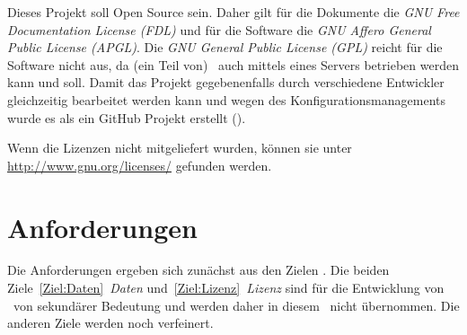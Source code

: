 Dieses Projekt soll Open Source sein.
Daher gilt für die Dokumente die \emph{GNU Free Documentation License (FDL)} und für die Software die \emph{GNU Affero General Public License (APGL)}.
Die \emph{GNU General Public License (GPL)} reicht für die Software nicht aus, da (ein Teil von) \ASBA\ auch mittels eines Servers betrieben werden kann und soll.
Damit das Projekt gegebenenfalls durch verschiedene Entwickler gleichzeitig bearbeitet werden kann und wegen des Konfigurationsmanagements wurde es als ein GitHub Projekt erstellt ().

Wenn die Lizenzen nicht mitgeliefert wurden, können sie unter \url{http://www.gnu.org/licenses/} gefunden werden.

\section     {Anforderungen}%
\label   {sec:Anforderungen}

Die Anforderungen ergeben sich zunächst aus den Zielen .
Die beiden Ziele~\ref{Ziel:Daten}~\emph{Daten} und~\ref{Ziel:Lizenz}~\emph{Lizenz} sind für die Entwicklung von \ASBA\ von sekundärer Bedeutung und werden daher in diesem \sectionname\ nicht übernommen.
Die anderen Ziele werden noch verfeinert.

